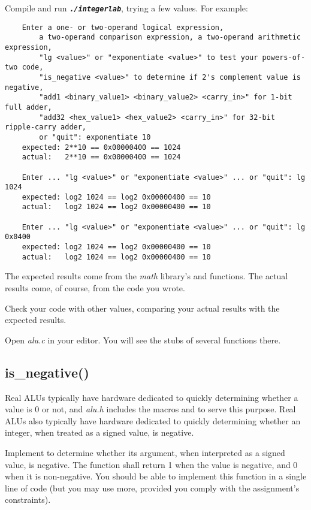 Compile and run \texttt{\textbf{\textit{./integerlab}}}, trying a few values.
For example:
\begin{verbatim}
    Enter a one- or two-operand logical expression,
        a two-operand comparison expression, a two-operand arithmetic expression,
        "lg <value>" or "exponentiate <value>" to test your powers-of-two code,
        "is_negative <value>" to determine if 2's complement value is negative,
        "add1 <binary_value1> <binary_value2> <carry_in>" for 1-bit full adder,
        "add32 <hex_value1> <hex_value2> <carry_in>" for 32-bit ripple-carry adder,
        or "quit": exponentiate 10
    expected: 2**10 == 0x00000400 == 1024
    actual:   2**10 == 0x00000400 == 1024

    Enter ... "lg <value>" or "exponentiate <value>" ... or "quit": lg 1024
    expected: log2 1024 == log2 0x00000400 == 10
    actual:   log2 1024 == log2 0x00000400 == 10

    Enter ... "lg <value>" or "exponentiate <value>" ... or "quit": lg 0x0400
    expected: log2 1024 == log2 0x00000400 == 10
    actual:   log2 1024 == log2 0x00000400 == 10
\end{verbatim}

The expected results come from the \textit{math} library's  and  functions.
The actual results come, of course, from the code you wrote.

Check your code with other values, comparing your actual results with the expected results.


\vspace{0.5cm}

Open \textit{alu.c} in your editor.
You will see the stubs of several functions there.


\subsection{is\_negative()} \label{subsec:negative}

Real ALUs typically have hardware dedicated to quickly determining whether a value is 0 or not, and \textit{alu.h} includes the macros  and  to serve this purpose.
Real ALUs also typically have hardware dedicated to quickly determining whether an integer, when treated as a signed value, is negative.

Implement  to determine whether its argument, when interpreted as a signed value, is negative.
The function shall return 1 when the value is negative, and 0 when it is non-negative.
You should be able to implement this function in a single line of code (but you may use more, provided you comply with the assignment's constraints).


